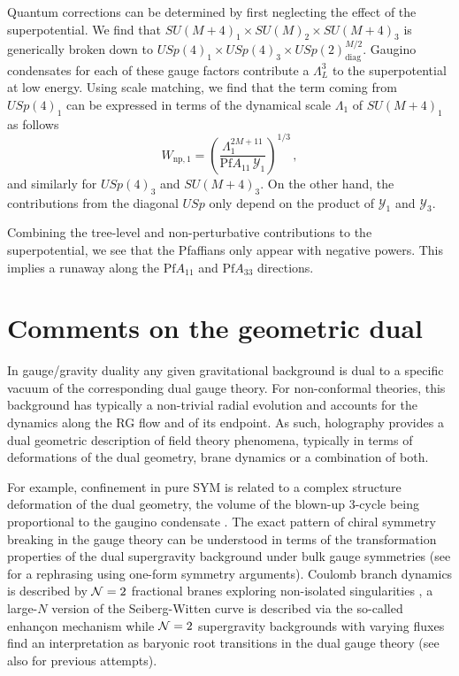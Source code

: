 \documentclass[a4paper,12pt]{article}
\begin{document}
{Quantum corrections can be determined by first neglecting the effect of the superpotential. We find that $SU(M+4)_1 \times SU(M)_2 \times SU(M+4)_3 $ is generically broken down to $USp(4)_1 \times USp(4)_3 \times USp(2)_{\text{diag}}^{M/2}$. Gaugino condensates for each of these gauge factors contribute a $\Lambda_L^3$ to the superpotential at low energy. Using scale matching, we find that the term coming from $USp(4)_1$ can be expressed in terms of the dynamical scale $\Lambda_1$ of $SU(M+4)_1$ as follows
\begin{equation}
	W_{\text{np},1} = \left(\frac{\Lambda_1^{2M+11}}{\mathrm{Pf}A_{11} \, \mathcal{Y}_1}\right)^{1/3}\, ,
\end{equation}
and similarly for $USp(4)_3$ and $SU(M+4)_3$. On the other hand, the contributions from the diagonal $USp$ only depend on the product of $\mathcal{Y}_1$ and $\mathcal{Y}_3$.

Combining the tree-level and non-perturbative contributions to the superpotential, we see that the Pfaffians only appear with negative powers. This implies a runaway along the $\mathrm{Pf}A_{11}$ and $\mathrm{Pf}A_{33}$ directions. 


\section{Comments on the geometric dual}
\label{geomdual}

In gauge/gravity duality any given gravitational background is dual to a specific vacuum of the corresponding dual gauge theory. For non-conformal theories,  this background has typically a non-trivial radial evolution and accounts for the dynamics along the RG flow and of its endpoint. As such, holography provides a dual geometric description of field theory phenomena, typically in terms of deformations of the dual geometry, brane dynamics or a combination of both.

For example, confinement in pure SYM is related to a complex structure deformation of the dual geometry, the volume of the blown-up 3-cycle being proportional to the gaugino condensate \cite{Klebanov:2000hb,Maldacena:2000yy}. The exact pattern of chiral symmetry breaking in the gauge theory can be understood in terms of the transformation properties of the dual supergravity background under bulk gauge symmetries \cite{Bertolini:2001qa,Klebanov:2002gr,Bertolini:2002xu} (see \cite{Apruzzi:2021phx} for a rephrasing using one-form symmetry arguments). Coulomb branch dynamics is described by ${\cal N}=2$ fractional branes exploring non-isolated singularities  \cite{Bertolini:2000dk,Polchinski:2000mx}, a large-$N$ version of the Seiberg-Witten curve is described via the so-called enhan\c{c}on mechanism \cite{Johnson:1999qt} while ${\cal N}=2$ supergravity backgrounds with varying fluxes find an interpretation as baryonic root transitions in the dual gauge theory \cite{Benini:2008ir} (see also \cite{Polchinski:2000mx,Aharony:2000pp} for previous attempts). 
 
}
\end{document}
